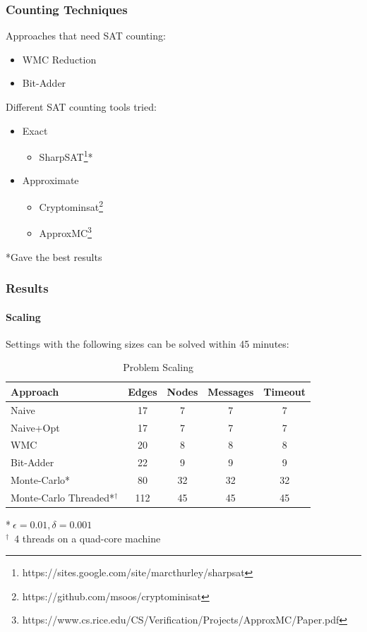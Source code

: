 \documentclass{beamer}
\begin{document}
\begin{frame}
\frametitle{Counting Techniques}
	Approaches that need SAT counting:
	\begin{itemize}
		\item WMC Reduction
		\item Bit-Adder\\[2ex]
	\end{itemize}

	Different SAT counting tools tried:
	\begin{itemize}
	\item Exact
		\begin{itemize}
		\item SharpSAT\footnote{https://sites.google.com/site/marcthurley/sharpsat}*
		\end{itemize}

	\item Approximate
		\begin{itemize}
		\item Cryptominsat\footnote{https://github.com/msoos/cryptominisat}
		\item ApproxMC\footnote{https://www.cs.rice.edu/CS/Verification/Projects/ApproxMC/Paper.pdf}\\[3ex]
		\end{itemize}
	\end{itemize}
	*Gave the best results
\end{frame}

\begin{frame}
\frametitle{Results}
\framesubtitle{Scaling}

	Settings with the following sizes can be solved within 45 minutes:

	\begin{table}
	\begin{tabular}{l | c | c | c | c}
	Approach & Edges & Nodes & Messages & Timeout\\
	\hline \hline
	Naive & 17 & 7 & 7 & 7\\
	Naive+Opt & 17 & 7 & 7 & 7\\
	WMC & 20 & 8 & 8 & 8\\
	Bit-Adder & 22 & 9 & 9 & 9\\
	Monte-Carlo* & 80 & 32 & 32 & 32\\
	Monte-Carlo Threaded*$^{\dagger}$ & 112 & 45 & 45 & 45\\
	\end{tabular}
	\caption{Problem Scaling}
	\end{table}
	*$\ \epsilon=0.01, \delta=0.001$\\
	$^{\dagger}$\ 4 threads on a quad-core machine


\end{frame}
\end{document}
